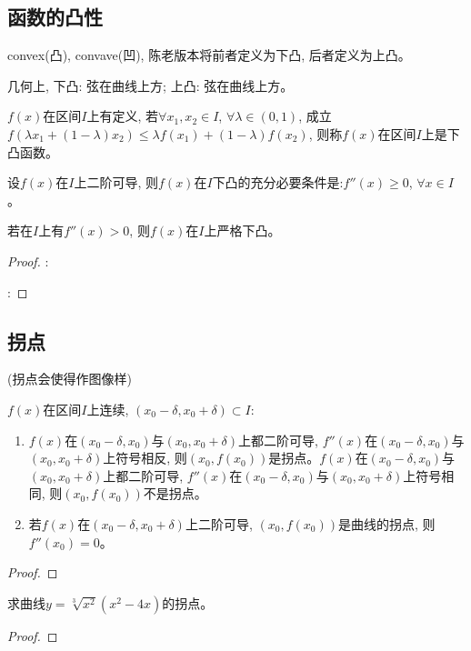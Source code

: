 \subsection{函数的凸性}
convex(凸), convave(凹), 陈老版本将前者定义为下凸, 后者定义为上凸。

几何上, 下凸: 弦在曲线上方; 上凸: 弦在曲线上方。

\begin{definition}
    $f(x)$在区间$I$上有定义, 若$\forall x_1, x_2 \in I$, $\forall \lambda \in (0, 1)$, 成立$f(\lambda x_1 + (1-\lambda)x_2) \le \lambda f(x_1) + (1-\lambda)f(x_2)$, 则称$f(x)$在区间$I$上是下凸函数。
\end{definition}

\begin{theorem}[二阶导数与凸性的关系]
    设$f(x)$在$I$上二阶可导, 则$f(x)$在$I$下凸的充分必要条件是:$f''(x)\ge 0$, $\forall x \in I$。

    若在$I$上有$f''(x) > 0$, 则$f(x)$在$I$上严格下凸。
\end{theorem}
\begin{proof}
    :

    :
\end{proof}

\subsection{拐点}
(拐点会使得作图像样)
\begin{theorem}
    $f(x)$在区间$I$上连续, $(x_0-\delta, x_0+\delta) \subset I$:
    \begin{enumerate}
        \item $f(x)$在$(x_0-\delta, x_0)$与$(x_0, x_0+\delta)$上都二阶可导, $f''(x)$在$(x_0-\delta, x_0)$与$(x_0, x_0+\delta)$上符号相反, 则$(x_0, f(x_0))$是拐点。$f(x)$在$(x_0-\delta, x_0)$与$(x_0, x_0+\delta)$上都二阶可导, $f''(x)$在$(x_0-\delta, x_0)$与$(x_0, x_0+\delta)$上符号相同, 则$(x_0, f(x_0))$不是拐点。
        \item 若$f(x)$在$(x_0-\delta, x_0+\delta)$上二阶可导, $(x_0, f(x_0))$是曲线的拐点, 则$f''(x_0) = 0$。
    \end{enumerate}
\end{theorem}
\begin{proof}
    
\end{proof}

\begin{example}
    求曲线$y = \sqrt[3]{x^2}(x^2-4x)$的拐点。
\end{example}
\begin{proof}
    
\end{proof}

